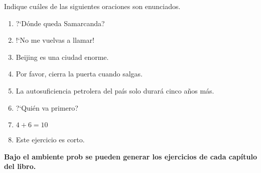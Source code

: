 \cleardoublepage
{}
\pagestyle{probprop}
\pagecolor{paginaprob}

\begin{prob} Indique cuáles de las siguientes oraciones son enunciados.
\begin{enumerate}
 \item ?`Dónde queda Samarcanda?
 \item !`No me vuelvas a llamar!
 \item Beijing es una ciudad enorme.
 \item Por favor, cierra la puerta cuando salgas.
 \item La autosuficiencia petrolera del país solo durará cinco años más.
 \item ?`Quién va primero?
 \item $4+6=10$
 \item Este ejercicio es corto.
\end{enumerate}
\end{prob}

\textbf{Bajo el ambiente prob se pueden generar los ejercicios de cada capítulo del libro.}
